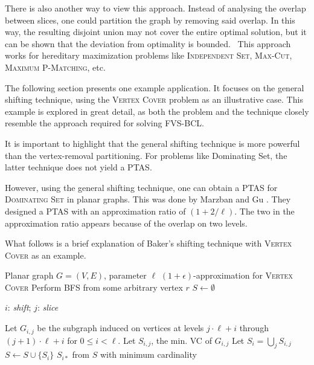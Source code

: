 There is also another way to view this approach. Instead of analysing the overlap between slices, one could partition the graph 
by removing said overlap. In this way, the resulting disjoint union may not cover the entire 
optimal solution, but it can be shown that the deviation from optimality is bounded. \
This approach works for hereditary maximization problems like \textsc{Independent Set}, \textsc{Max-Cut}, 
\textsc{Maximum P-Matching}, etc. 

The following section presents one example application.
It focuses on the general shifting technique, using the \textsc{Vertex Cover} problem 
as an illustrative case. 
This example is explored in great detail, as both the problem and the technique 
closely resemble the approach required for solving FVS-BCL.

It is important to highlight that the general shifting technique is more powerful than 
the vertex-removal partitioning. For problems like Dominating Set, the latter technique does not 
yield a PTAS.

However, using the general shifting technique, one can obtain a 
PTAS for \textsc{Dominating Set} in planar graphs. This was done by Marzban and Gu \cite{dominatingsetptas}. They designed a PTAS with an 
approximation ratio of $(1 + 2/\ell)$. The two in the approximation 
ratio appears because of the overlap on two levels.

What follows is a brief explanation of Baker's shifting technique with \textsc{Vertex Cover} as an example.

\begin{algorithm}[H]
    \caption{Baker's shifting technique}
    \label{alg:baker}
    \begin{algorithmic}[1]
    \REQUIRE Planar graph $G = (V, E)$, parameter $\ell$
    \ENSURE $(1 + \epsilon)$-approximation for \textsc{Vertex Cover}
    \STATE Perform \textsc{BFS} from some arbitrary vertex $r$
    \STATE $S \leftarrow \emptyset$

    $i$: \textit{shift}; $j$: \textit{slice}

        \STATE Let $G_{i, j}$ be the subgraph induced on vertices at levels $j \cdot \ell + i$ through $(j+1) \cdot \ell + i$ for $0 \leq i < \ell$. \label{line:4}
        \STATE Let $S_{i, j}$, the min. \textsc{VC} of $G_{i, j}$ \label{prel:step5}
        \STATE Let $S_i = \bigcup_{j} S_{i, j}$
        \STATE $S \leftarrow S \cup \{ S_i \}$
    \ENDFOR
    \RETURN $S_{i*}$ from $S$ with minimum cardinality
    \end{algorithmic}
\end{algorithm}

